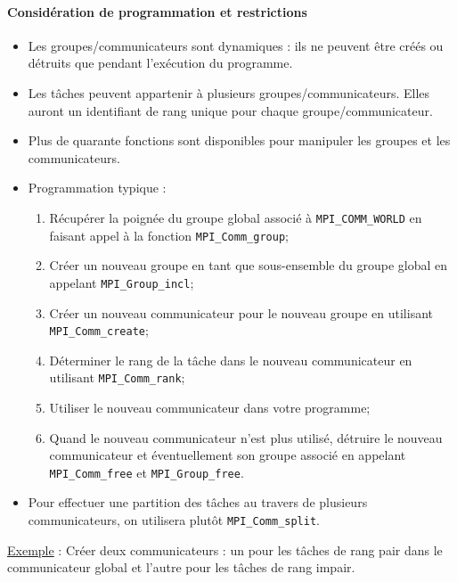 \documentclass[11pt,a4paper]{article}
\begin{document}
\paragraph{Considération de programmation et restrictions}
\begin{itemize}
\item Les groupes/communicateurs sont dynamiques : ils ne peuvent être créés ou détruits que pendant l'exécution du programme.
\item Les tâches peuvent appartenir à plusieurs groupes/communicateurs. Elles auront un identifiant de rang unique pour chaque groupe/communicateur.
\item Plus de quarante fonctions sont disponibles pour manipuler les groupes et les communicateurs.
\item Programmation typique :
\begin{enumerate}
\item Récupérer la poignée du groupe global associé à \texttt{MPI\_COMM\_WORLD} en faisant appel à la fonction \texttt{MPI\_Comm\_group};
\item Créer un nouveau groupe en tant que sous-ensemble du groupe global en appelant \texttt{MPI\_Group\_incl};
\item Créer un  nouveau communicateur pour le nouveau groupe en utilisant \texttt{MPI\_Comm\_create};
\item Déterminer le rang de la tâche dans le nouveau communicateur en utilisant \texttt{MPI\_Comm\_rank};
\item Utiliser le nouveau communicateur dans votre programme;
\item Quand le nouveau communicateur n'est plus utilisé, détruire le nouveau communicateur et éventuellement son groupe associé en appelant \texttt{MPI\_Comm\_free} et \texttt{MPI\_Group\_free}.
\end{enumerate}
\item Pour effectuer une partition des tâches au travers de plusieurs communicateurs, on utilisera plutôt \texttt{MPI\_Comm\_split}.
\end{itemize}

\underline{Exemple} : Créer deux communicateurs : un pour les tâches de rang pair dans le communicateur global
et l'autre pour les tâches de rang impair.
\end{document}
